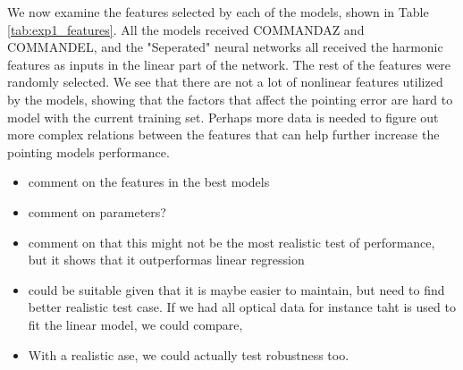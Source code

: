 We now examine the features selected by each of the models, shown in Table \ref{tab:exp1_features}.
All the models received COMMANDAZ and COMMANDEL, and the "Seperated" neural networks all received the harmonic features as inputs in the linear part of the network.
The rest of the features were randomly selected.
We see that there are not a lot of nonlinear features utilized by the models, showing that the factors that affect the pointing error are hard to model with the current training set.
Perhaps more data is needed to figure out more complex relations between the features that can help further increase the pointing models performance.


\begin{itemize}
    \item comment on the features in the best models
    \item comment on parameters?
    \item comment on that this might not be the most realistic test of performance, but it shows that it outperformas linear regression
    \item could be suitable given that it is maybe easier to maintain, but need to find better realistic test case. If we had all optical data for instance taht is used to fit the linear model, we could compare,
    \item With a realistic ase, we could actually test robustness too.
\end{itemize}


